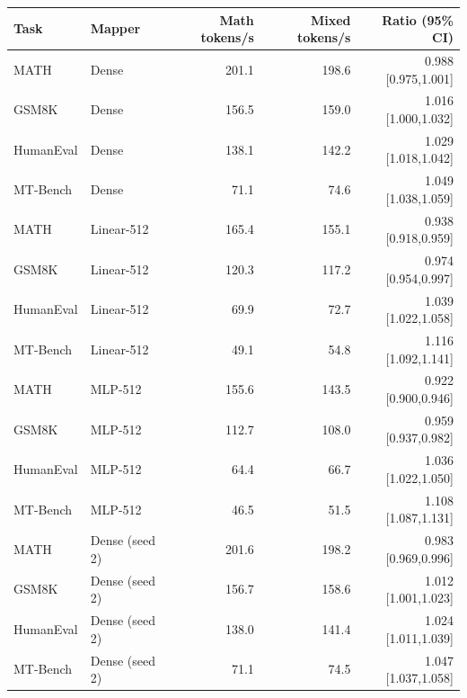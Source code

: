 \begin{tabular}{llrrr}
\toprule
Task & Mapper & Math tokens/s & Mixed tokens/s & Ratio (95\% CI) \\
\midrule
MATH & Dense & 201.1 & 198.6 & 0.988 [0.975,1.001] \\
GSM8K & Dense & 156.5 & 159.0 & 1.016 [1.000,1.032] \\
HumanEval & Dense & 138.1 & 142.2 & 1.029 [1.018,1.042] \\
MT-Bench & Dense & 71.1 & 74.6 & 1.049 [1.038,1.059] \\
MATH & Linear-512 & 165.4 & 155.1 & 0.938 [0.918,0.959] \\
GSM8K & Linear-512 & 120.3 & 117.2 & 0.974 [0.954,0.997] \\
HumanEval & Linear-512 & 69.9 & 72.7 & 1.039 [1.022,1.058] \\
MT-Bench & Linear-512 & 49.1 & 54.8 & 1.116 [1.092,1.141] \\
MATH & MLP-512 & 155.6 & 143.5 & 0.922 [0.900,0.946] \\
GSM8K & MLP-512 & 112.7 & 108.0 & 0.959 [0.937,0.982] \\
HumanEval & MLP-512 & 64.4 & 66.7 & 1.036 [1.022,1.050] \\
MT-Bench & MLP-512 & 46.5 & 51.5 & 1.108 [1.087,1.131] \\
MATH & Dense (seed 2) & 201.6 & 198.2 & 0.983 [0.969,0.996] \\
GSM8K & Dense (seed 2) & 156.7 & 158.6 & 1.012 [1.001,1.023] \\
HumanEval & Dense (seed 2) & 138.0 & 141.4 & 1.024 [1.011,1.039] \\
MT-Bench & Dense (seed 2) & 71.1 & 74.5 & 1.047 [1.037,1.058] \\
\bottomrule
\end{tabular}
